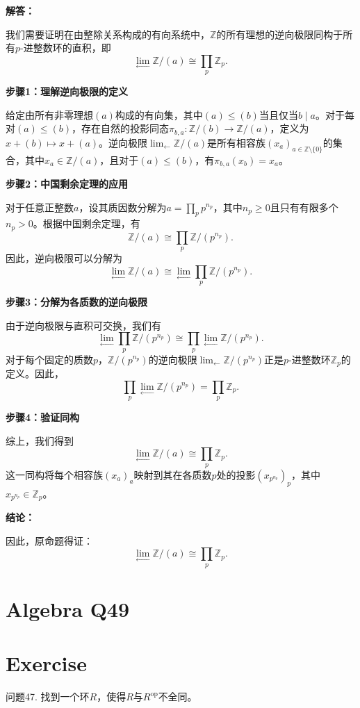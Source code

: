 \documentclass[12pt]{book}
\begin{document}
\textbf{解答：}

我们需要证明在由整除关系构成的有向系统中，$\mathbb{Z}$的所有理想的逆向极限同构于所有$p$-进整数环的直积，即
\[
\lim_{\leftarrow} \mathbb{Z}/(a) \cong \prod_{p} \mathbb{Z}_{p}.
\]

\textbf{步骤1：理解逆向极限的定义}

给定由所有非零理想$(a)$构成的有向集，其中$(a) \leq (b)$当且仅当$b \mid a$。对于每对$(a) \leq (b)$，存在自然的投影同态$\pi_{b,a}: \mathbb{Z}/(b) \to \mathbb{Z}/(a)$，定义为$x + (b) \mapsto x + (a)$。逆向极限$\lim_{\leftarrow} \mathbb{Z}/(a)$是所有相容族$(x_a)_{a \in \mathbb{Z}\setminus\{0\}}$的集合，其中$x_a \in \mathbb{Z}/(a)$，且对于$(a) \leq (b)$，有$\pi_{b,a}(x_b) = x_a$。

\textbf{步骤2：中国剩余定理的应用}

对于任意正整数$a$，设其质因数分解为$a = \prod_{p} p^{n_p}$，其中$n_p \geq 0$且只有有限多个$n_p > 0$。根据中国剩余定理，有
\[
\mathbb{Z}/(a) \cong \prod_{p} \mathbb{Z}/(p^{n_p}).
\]
因此，逆向极限可以分解为
\[
\lim_{\leftarrow} \mathbb{Z}/(a) \cong \lim_{\leftarrow} \prod_{p} \mathbb{Z}/(p^{n_p}).
\]

\textbf{步骤3：分解为各质数的逆向极限}

由于逆向极限与直积可交换，我们有
\[
\lim_{\leftarrow} \prod_{p} \mathbb{Z}/(p^{n_p}) \cong \prod_{p} \lim_{\leftarrow} \mathbb{Z}/(p^{n_p}).
\]
对于每个固定的质数$p$，$\mathbb{Z}/(p^{n_p})$的逆向极限$\lim_{\leftarrow} \mathbb{Z}/(p^{n_p})$正是$p$-进整数环$\mathbb{Z}_p$的定义。因此，
\[
\prod_{p} \lim_{\leftarrow} \mathbb{Z}/(p^{n_p}) = \prod_{p} \mathbb{Z}_p.
\]

\textbf{步骤4：验证同构}

综上，我们得到
\[
\lim_{\leftarrow} \mathbb{Z}/(a) \cong \prod_{p} \mathbb{Z}_p.
\]
这一同构将每个相容族$(x_a)_a$映射到其在各质数$p$处的投影$(x_{p^{n_p}})_p$，其中$x_{p^{n_p}} \in \mathbb{Z}_p$。

\textbf{结论：}

因此，原命题得证：
\[
\lim_{\leftarrow} \mathbb{Z}/(a) \cong \prod_{p} \mathbb{Z}_{p}.
\]
\newpage
\section{Algebra Q49}
\section*{Exercise}
问题47. 找到一个环$R$，使得$R$与$R^{\text{op}}$不全同。
\end{document}
